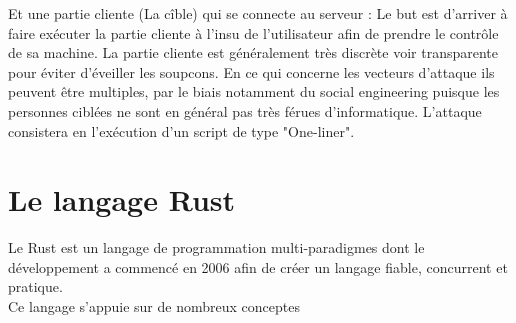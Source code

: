 \documentclass[a4paper]{article}
\begin{document}
Et une partie cliente (La cîble) qui se connecte au serveur : Le but est d'arriver à faire exécuter la partie cliente à l'insu de l'utilisateur afin de  prendre le contrôle de sa machine. La partie cliente est généralement très discrète voir transparente pour éviter d'éveiller les soupcons. En ce qui concerne les vecteurs d'attaque ils peuvent être multiples, par le biais notamment du social engineering puisque les personnes ciblées ne sont en général pas très férues d'informatique. L'attaque consistera en l'exécution d'un script de type "One-liner".
\newpage

\section{Le langage Rust}
Le Rust est un langage de programmation multi-paradigmes dont le développement a commencé en 2006 afin de créer un langage fiable, concurrent et pratique.\\
Ce langage s'appuie sur de nombreux conceptes 
\bigskip
\end{document}
